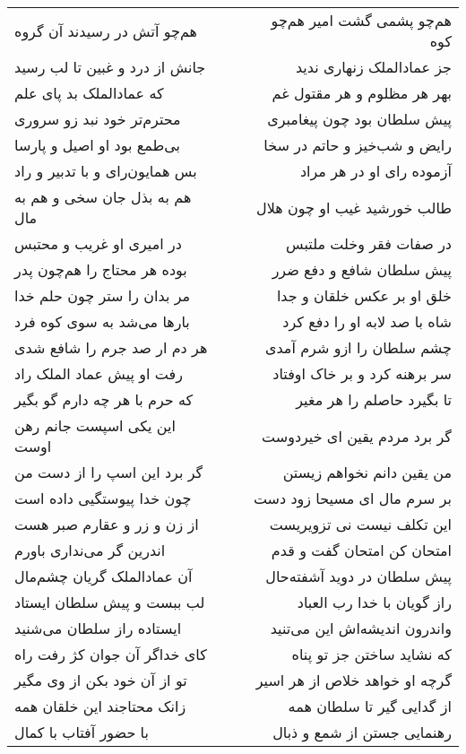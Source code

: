 \begin{center}
\begin{longtable}{l p{0.5cm} r}
\\
هم‌چو آتش در رسیدند آن گروه
&&
هم‌چو پشمی گشت امیر هم‌چو کوه
\\
جانش از درد و غبین تا لب رسید
&&
جز عمادالملک زنهاری ندید
\\
که عمادالملک بد پای علم
&&
بهر هر مظلوم و هر مقتول غم
\\
محترم‌تر خود نبد زو سروری
&&
پیش سلطان بود چون پیغامبری
\\
بی‌طمع بود او اصیل و پارسا
&&
رایض و شب‌خیز و حاتم در سخا
\\
بس همایون‌رای و با تدبیر و راد
&&
آزموده رای او در هر مراد
\\
هم به بذل جان سخی و هم به مال
&&
طالب خورشید غیب او چون هلال
\\
در امیری او غریب و محتبس
&&
در صفات فقر وخلت ملتبس
\\
بوده هر محتاج را هم‌چون پدر
&&
پیش سلطان شافع و دفع ضرر
\\
مر بدان را ستر چون حلم خدا
&&
خلق او بر عکس خلقان و جدا
\\
بارها می‌شد به سوی کوه فرد
&&
شاه با صد لابه او را دفع کرد
\\
هر دم ار صد جرم را شافع شدی
&&
چشم سلطان را ازو شرم آمدی
\\
رفت او پیش عماد الملک راد
&&
سر برهنه کرد و بر خاک اوفتاد
\\
که حرم با هر چه دارم گو بگیر
&&
تا بگیرد حاصلم را هر مغیر
\\
این یکی اسپست جانم رهن اوست
&&
گر برد مردم یقین ای خیردوست
\\
گر برد این اسپ را از دست من
&&
من یقین دانم نخواهم زیستن
\\
چون خدا پیوستگیی داده است
&&
بر سرم مال ای مسیحا زود دست
\\
از زن و زر و عقارم صبر هست
&&
این تکلف نیست نی تزویریست
\\
اندرین گر می‌نداری باورم
&&
امتحان کن امتحان گفت و قدم
\\
آن عمادالملک گریان چشم‌مال
&&
پیش سلطان در دوید آشفته‌حال
\\
لب ببست و پیش سلطان ایستاد
&&
راز گویان با خدا رب العباد
\\
ایستاده راز سلطان می‌شنید
&&
واندرون اندیشه‌اش این می‌تنید
\\
کای خداگر آن جوان کژ رفت راه
&&
که نشاید ساختن جز تو پناه
\\
تو از آن خود بکن از وی مگیر
&&
گرچه او خواهد خلاص از هر اسیر
\\
زانک محتاجند این خلقان همه
&&
از گدایی گیر تا سلطان همه
\\
با حضور آفتاب با کمال
&&
رهنمایی جستن از شمع و ذبال

\end{longtable}
\end{center}
